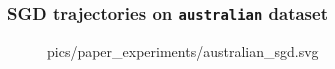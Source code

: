 \begin{frame}
    \frametitle{SGD trajectories on \texttt{australian} dataset}
    \begin{figure}[htpb]
        \begin{center}
            
                {pics/paper_experiments/australian_sgd.svg}
        \end{center}
    \end{figure}
\end{frame}
